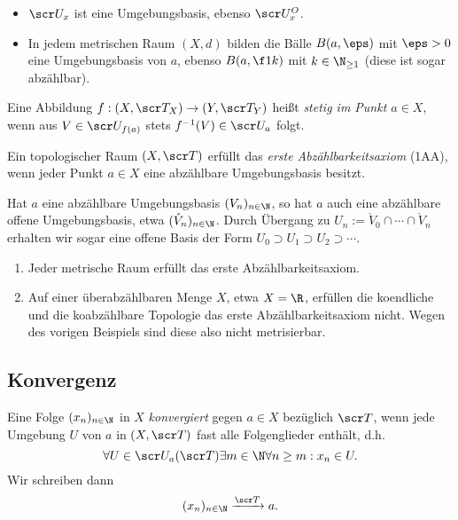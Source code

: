 \begin{ex}
	\begin{itemize}
		\item
			$\scr U_x$ ist eine Umgebungsbasis, ebenso $\scr U_x^O$.
		\item
			In jedem metrischen Raum $(X,d)$ bilden die Bälle $B(a,\eps)$ mit $\eps > 0$ eine Umgebungsbasis von $a$, ebenso $B(a, \f 1k)$ mit $k \in \N_{\ge 1}$ (diese ist sogar abzählbar).
	\end{itemize}
\end{ex}

\begin{df}
	Eine Abbildung $f: (X, \scr T_X) \to (Y, \scr T_Y)$ heißt \emph{stetig im Punkt $a \in X$}, wenn aus $V \in \scr U_{f(a)}$ stets $f^{-1}(V) \in \scr U_a$ folgt.
\end{df}

\begin{df} \label{df:first_axiom_of_countability}
	Ein topologischer Raum $(X, \scr T)$ erfüllt das \emph{erste Abzählbarkeitsaxiom} (1AA), wenn jeder Punkt $a \in X$ eine abzählbare Umgebungsbasis besitzt.
	\begin{note}
		Hat $a$ eine abzählbare Umgebungsbasis $(V_n)_{n\in\N}$, so hat $a$ auch eine abzählbare offene Umgebungsbasis, etwa $(\mathring V_n)_{n\in\N}$.
		Durch Übergang zu $U_n := \mathring V_0 \cap \dotsb \cap \mathring V_n$ erhalten wir sogar eine offene Basis der Form $U_0 \supset U_1 \supset U_2 \supset \dotsb$.
	\end{note}
\end{df}

\begin{ex}
	\begin{enumerate}[1.]
		\item
			Jeder metrische Raum erfüllt das erste Abzählbarkeitsaxiom.
		\item
			Auf einer überabzählbaren Menge $X$, etwa $X = \R$, erfüllen die koendliche und die koabzählbare Topologie das erste Abzählbarkeitsaxiom nicht.
			Wegen des vorigen Beispiels sind diese also nicht metrisierbar.
	\end{enumerate}
\end{ex}

\subsection{Konvergenz}

\begin{df}[Konvergenz]
	Eine Folge $(x_n)_{n\in \N}$ in $X$ \emph{konvergiert} gegen $a \in X$ bezüglich $\scr T$, wenn jede Umgebung $U$ von $a$ in $(X, \scr T)$ fast alle Folgenglieder enthält, d.h.
	\[
		\forall U \in \scr U_a(\scr T) \exists m \in \N \forall n \ge m : x_n \in U.
	\]
	Wir schreiben dann
	\[
		(x_n)_{n\in \N} \xrightarrow{\scr T} a.
	\]
\end{df}

